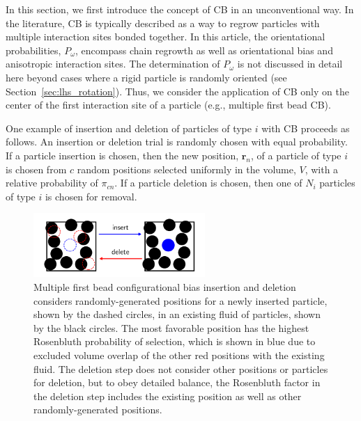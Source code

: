 \documentclass[
  9pt,
  bestpractices,
]{livecoms}
\begin{document}
In this section, we first introduce the concept of CB \cite{rosenbluth_monte_1955, siepmann_configurational_1992, mooij_direct_1992, de_pablo_estimation_1992} in an unconventional way.
In the literature, CB is typically described as a way to regrow particles with multiple interaction sites bonded together.
In this article, the orientational probabilities, $P_{\omega}$, encompass chain regrowth as well as orientational bias and anisotropic interaction sites.
The determination of $P_{\omega}$ is not discussed in detail here beyond cases where a rigid particle is randomly oriented (see Section~\ref{sec:lhs_rotation}).
Thus, we consider the application of CB only on the center of the first interaction site of a particle (e.g., multiple first bead CB).

One example of insertion and deletion of particles of type $i$ with CB proceeds as follows.
An insertion or deletion trial is randomly chosen with equal probability.
If a particle insertion is chosen, then the new position, $\mathbf{r}_n$, of a particle of type $i$ is chosen from ${c}$ random positions selected uniformly in the volume, $V$, with a relative probability of $\pi_{cn}$.
If a particle deletion is chosen, then one of $N_i$ particles of type $i$ is chosen for removal.

\begin{figure}
\begin{centering}
\includegraphics[width=6.5cm]{../figures/muvt_cb.pdf}
\caption{
Multiple first bead configurational bias insertion and deletion considers randomly-generated positions for a newly inserted particle, shown by the dashed circles, in an existing fluid of particles, shown by the black circles.
The most favorable position has the highest Rosenbluth probability of selection, which is shown in blue due to excluded volume overlap of the other red positions with the existing fluid.
The deletion step does not consider other positions or particles for deletion, but to obey detailed balance, the Rosenbluth factor in the deletion step includes the existing position as well as other randomly-generated positions.
}
\label{fig:muvt_cb}
\end{centering}
\end{figure}
\end{document}
